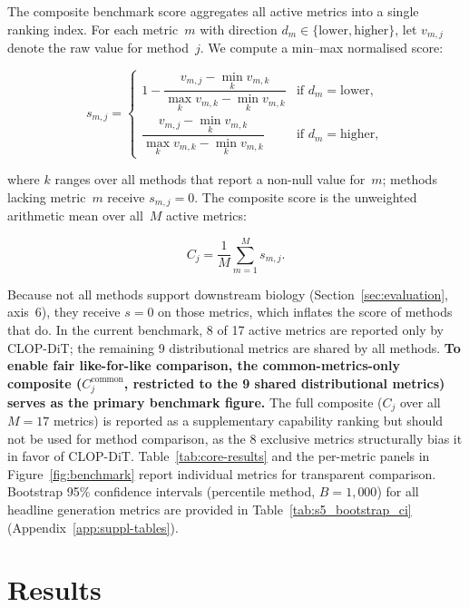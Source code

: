 \documentclass[11pt,a4paper]{article}
\begin{document}
The composite benchmark score aggregates all active metrics into a single ranking index. For each metric~$m$ with direction $d_m \in \{\text{lower}, \text{higher}\}$, let $v_{m,j}$ denote the raw value for method~$j$. We compute a min--max normalised score:
\begin{linenomath}
\begin{equation}
  s_{m,j} =
  \begin{cases}
    1 - \dfrac{v_{m,j} - \min_k v_{m,k}}{\max_k v_{m,k} - \min_k v_{m,k}} & \text{if } d_m = \text{lower},\\[6pt]
    \dfrac{v_{m,j} - \min_k v_{m,k}}{\max_k v_{m,k} - \min_k v_{m,k}} & \text{if } d_m = \text{higher},
  \end{cases}
  \label{eq:norm}
\end{equation}
\end{linenomath}
where $k$ ranges over all methods that report a non-null value for~$m$; methods lacking metric~$m$ receive $s_{m,j} = 0$. The composite score is the unweighted arithmetic mean over all~$M$ active metrics:
\begin{linenomath}
\begin{equation}
  C_j = \frac{1}{M}\sum_{m=1}^{M} s_{m,j}.
  \label{eq:composite}
\end{equation}
\end{linenomath}
Because not all methods support downstream biology (Section~\ref{sec:evaluation}, axis~6), they receive $s = 0$ on those metrics, which inflates the score of methods that do. In the current benchmark, 8 of 17 active metrics are reported only by CLOP-DiT; the remaining 9 distributional metrics are shared by all methods. \textbf{To enable fair like-for-like comparison, the common-metrics-only composite ($C_j^{\text{common}}$, restricted to the 9 shared distributional metrics) serves as the primary benchmark figure.} The full composite ($C_j$ over all $M = 17$ metrics) is reported as a supplementary capability ranking but should not be used for method comparison, as the 8 exclusive metrics structurally bias it in favor of CLOP-DiT. Table~\ref{tab:core-results} and the per-metric panels in Figure~\ref{fig:benchmark} report individual metrics for transparent comparison. Bootstrap 95\% confidence intervals (percentile method, $B{=}1{,}000$) for all headline generation metrics are provided in Table~\ref{tab:s5_bootstrap_ci} (Appendix~\ref{app:suppl-tables}).

\FloatBarrier
\section{Results}\label{sec:results}
\end{document}
